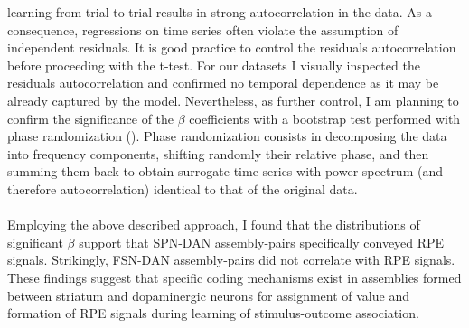 learning from trial to trial results in strong autocorrelation in the data. As a consequence, regressions on time series often violate the assumption of independent residuals. It is good practice to control the residuals autocorrelation before proceeding with the t-test. For our datasets I visually inspected the residuals autocorrelation and confirmed no temporal dependence as it may be already captured by the model. Nevertheless, as further control, I am planning to confirm the significance of the $\beta$ coefficients with a bootstrap test performed with phase randomization (\cite{Mokeichev}). Phase randomization consists in decomposing the data into frequency components, shifting randomly their relative phase, and then summing them back to obtain surrogate time series with power spectrum (and therefore autocorrelation) identical to that of the original data.\\\\Employing the above described approach, I found that the distributions of significant $\beta$ support that SPN-DAN assembly-pairs specifically conveyed RPE signals. Strikingly, FSN-DAN assembly-pairs did not correlate with RPE signals. These findings suggest that specific coding mechanisms exist in assemblies formed between striatum and dopaminergic neurons for assignment of value and formation of RPE signals during learning of stimulus-outcome association. \\\\
